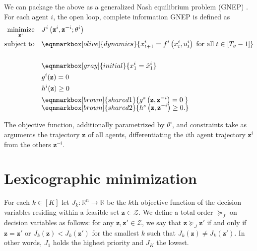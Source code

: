 We can package the above as a generalized Nash equilibrium problem (GNEP) \cite{liu:2023}.
For each agent \(i\), the open loop, complete information GNEP is defined as
\begin{align}
\begin{split}
\minimize_{\mathbf{z}^i} \quad & J^i\left(\mathbf{z}^i, \mathbf{z}^{-i}; \theta^i \right) \\
\text{subject to} \quad & \eqnmarkbox[olive]{dynamics}{x_{t+1}^i=f^i\left(x_t^i, u_t^i\right)\; \text{for all} \; t \in[T_g-1]} \\
& \\ %
& \eqnmarkbox[gray]{initial}{x_1^i=\hat{x}_1^i} \\
& g^i(\mathbf{z}) = 0 \\
& h^i(\mathbf{z}) \geq 0 \\
& \eqnmarkbox[brown]{shared1}{g^s\left(\mathbf{z}, \mathbf{z}^{-i}\right) = 0\!\:\:} \\[-.5em]
& \eqnmarkbox[brown]{shared2}{h^s\left(\mathbf{z}, \mathbf{z}^{-i}\right) \geq 0.}
\end{split}
\label{eq:trajgame}
\end{align}

\vspace{1.7em}\noindent
The objective function, additionally parametrized by \(\theta^i\), and constraints
take as arguments the trajectory \(\mathbf{z}\) of all agents,
differentiating the \(i\text{th}\) agent trajectory \(\mathbf{z}^i\) from
the others \(\mathbf{z}^{-i}\).

\section{Lexicographic minimization}
\label{sec:lexmin}

For each \(k \in [K]\) let \(J_k \colon \mathbb{R}^n \to \mathbb{R}\)
be the \(k\text{th}\) objective function
of the decision variables residing
within a feasible set \(\mathbf{z} \in \mathcal{Z}\).
We define a total order \(\succcurlyeq_J\) on decision variables as follows:
for any \(\mathbf{z}, \mathbf{z}' \in \mathcal{Z}\),
we say that \(\mathbf{z} \succcurlyeq_J \mathbf{z}'\)
if and only if \(\mathbf{z} = \mathbf{z}'\)
or \(J_k(\mathbf{z}) < J_k(\mathbf{z}')\)
for the smallest \(k\) such that \(J_k(\mathbf{z}) \neq J_k(\mathbf{z}')\).
In other words, \(J_1\) holds the highest priority and \(J_K\) the lowest.

